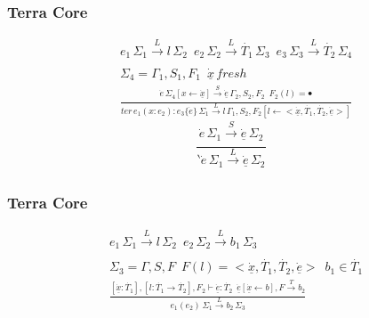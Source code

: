\documentclass{beamer}
\begin{document}
\begin{frame}
  \frametitle{Terra Core}
	\begin{equation}
    \begin{split}
      & e_1 \, \Sigma_1 \xrightarrow[]{L} l \, \Sigma_2 \enspace e_2 \, \Sigma_2 \xrightarrow[]{L} \dot{T_1} \, \Sigma_3 \enspace e_3 \, \Sigma_3 \xrightarrow[]{L} \dot{T_2} \, \Sigma_4 \\
      & \Sigma_4 = \Gamma_1, S_1, F_1 \enspace \underline{\dot{x}} \, fresh \\
      & \frac{\dot{e} \, \Sigma_4[x \leftarrow \underline{\dot{x}}] \xrightarrow[]{S} \underline{\dot{e}} \, \Gamma_2, S_2, F_2 \enspace F_2(l) = \bullet}{ter \, e_1(x: e_2): e_3\{\dot{e}\} \, \Sigma_1 \xrightarrow[]{L} l \, \Gamma_1, S_2, F_2[l \leftarrow <\underline{\dot{x}}, \dot{T_1}, \dot{T_2}, \underline{\dot{e}}>]}
    \end{split} \tag{LTDEFN}
  \end{equation}
  \newline
  \begin{equation}
    \frac{\dot{e} \, \Sigma_1 \xrightarrow[]{S} \underline{\dot{e}} \, \Sigma_2}{\backprime{\dot{e}} \, \Sigma_1 \xrightarrow[]{L} \underline{\dot{e}} \, \Sigma_2}\tag{LTQUOTE}
  \end{equation}
\end{frame}

\begin{frame}
  \frametitle{Terra Core}
  \begin{equation}
    \begin{split}
      & e_1 \, \Sigma_1 \xrightarrow[]{L} l \, \Sigma_2 \enspace e_2 \, \Sigma_2 \xrightarrow[]{L} b_1 \, \Sigma_3 \\
      & \Sigma_3 = \Gamma, S, F \enspace F(l) = <\underline{\dot{x}}, \dot{T_1}, \dot{T_2}, \underline{\dot{e}}> \enspace b_1 \in \dot{T_1} \\
      & \frac{[\underline{\dot{x}}: \dot{T_1}], [l: \dot{T_1} \rightarrow \dot{T_2}], F_2 \vdash \underline{\dot{e}}: \dot{T_2} \enspace \underline{\dot{e}}[\underline{\dot{x}} \leftarrow b], F \xrightarrow[]{T} b_2}{e_1(e_2) \, \Sigma_1 \xrightarrow[]{L} b_2 \, \Sigma_3}
    \end{split} \tag{LTAPP}
  \end{equation}
\end{frame}
\end{document}
